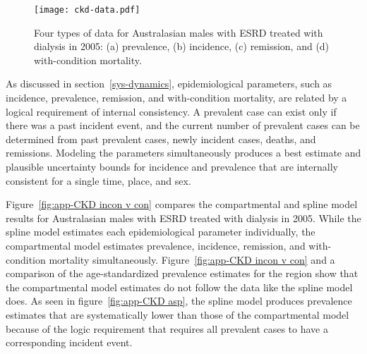 
    \begin{figure}[h]
        \begin{center}
            \texttt{[image: ckd-data.pdf]}
            \caption[Systematic review data for end-stage renal disease
              treated with dialysis.]{Four types of data for Australasian
              males with ESRD treated with dialysis
              in 2005: (a) prevalence, (b) incidence, (c)
              remission, and (d) with-condition mortality.}
            \label{fig:app-CKD data}
        \end{center}
    \end{figure}

As discussed in section~\ref{sys-dynamics}, epidemiological parameters,
such as incidence, prevalence, remission, and with-condition
mortality, are related by a logical requirement of internal
consistency.  A prevalent case can exist only if there was a past
incident event, and the current number of prevalent cases can be
determined from past prevalent cases, newly incident cases, deaths, and
remissions.  Modeling the parameters simultaneously produces a best
estimate and plausible uncertainty bounds for incidence and prevalence
that are internally consistent for a single time, place, and sex.

Figure~\ref{fig:app-CKD incon v con} compares the compartmental and
spline model results for Australasian males with
ESRD treated with dialysis in 2005.  While the spline model estimates each
epidemiological parameter individually, the compartmental model estimates
prevalence, incidence, remission, and with-condition mortality
simultaneously.  Figure~\ref{fig:app-CKD incon v con} and a
comparison of the age-standardized prevalence estimates for the region
show that the compartmental model estimates do not follow the data
like the spline model does.  As seen in figure~\ref{fig:app-CKD asp}, the
spline model produces prevalence estimates that are systematically lower
than those of the compartmental model because of the logic requirement that
requires all prevalent cases to have a corresponding incident event.

